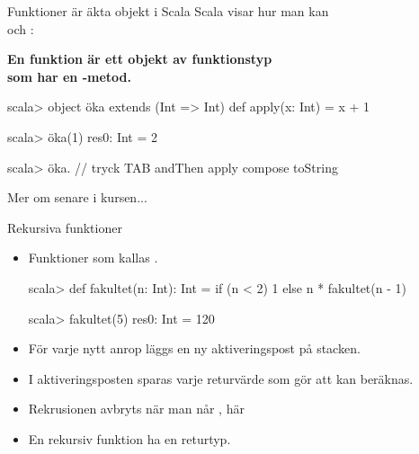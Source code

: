 \begin{Slide}{Funktioner är äkta objekt i Scala}
Scala visar hur man kan   \\  och : \\\vspace{0.5em}

\textbf{\Large En funktion är ett objekt av funktionstyp\\ som har en -metod.}
\pause
\begin{REPLnonum}
scala> object öka extends (Int => Int) { 
         def apply(x: Int) = x + 1 
       }


scala> öka(1)
res0: Int = 2

scala> öka.   // tryck TAB
andThen   apply   compose   toString
\end{REPLnonum}
Mer om  senare i kursen... %
\end{Slide} 


\begin{Slide}{Rekursiva funktioner}
\begin{itemize}
\item Funktioner som  kallas .


\begin{REPLnonum}
scala> def fakultet(n: Int): Int = 
         if (n < 2) 1 else n * fakultet(n - 1)

scala> fakultet(5)
res0: Int = 120
\end{REPLnonum}

\item För varje nytt anrop läggs en ny aktiveringspost på stacken. 

\item I aktiveringsposten sparas varje returvärde som gör att  kan beräknas. 

\item Rekrusionen avbryts när man når , här 

\item En rekursiv funktion  ha en returtyp.

\end{itemize}

\end{Slide} 

